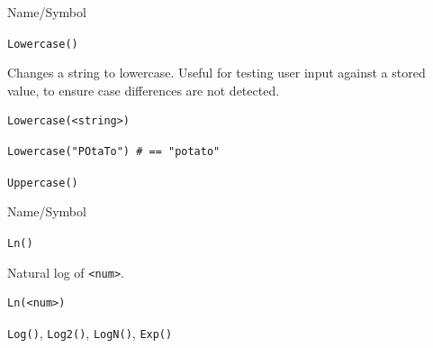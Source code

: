 \begin{desc}{Name/Symbol}
\item[Name/Symbol]	\verb+Lowercase()+

\item[Description]	Changes a string to lowercase.  Useful for testing user
		input against a stored value, to ensure case differences
		are not detected.

\item[Usage]
\begin{verbatim}
Lowercase(<string>)
\end{verbatim}

\item[Example]
\begin{verbatim}
Lowercase("POtaTo")	# == "potato"
\end{verbatim}

\item[See Also]	\verb+Uppercase()+
\end{desc}

\begin{desc}{Name/Symbol}
\item[Name/Symbol]	\verb+Ln()+

\item[Description]	Natural log of \verb+<num>+.

\item[Usage]		
\begin{verbatim}
Ln(<num>)
\end{verbatim}

\item[Example]	

\item[See Also]	\verb+Log()+, \verb+Log2()+, \verb+LogN()+, \verb+Exp()+     
\end{desc}






